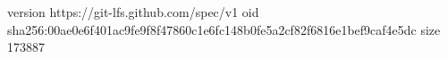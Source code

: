 version https://git-lfs.github.com/spec/v1
oid sha256:00ae0e6f401ac9fe9f8f47860c1e6fc148b0fe5a2cf82f6816e1bef9caf4e5dc
size 173887
